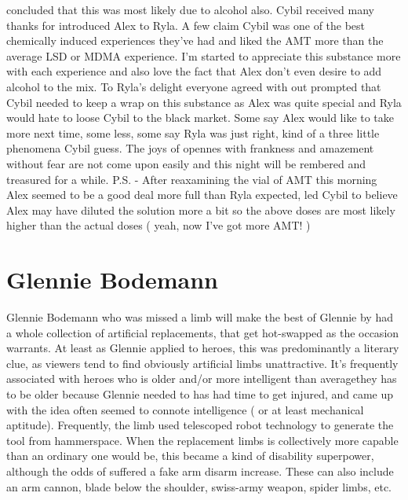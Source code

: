 \documentclass[12pt]{book}
\begin{document}
concluded that this was most likely due to alcohol also. Cybil received many thanks for introduced Alex to Ryla. A few claim Cybil was one of the best chemically induced experiences they've had and liked the AMT more than the average LSD or MDMA experience. I'm started to appreciate this substance more with each experience and also love the fact that Alex don't even desire to add alcohol to the mix. To Ryla's delight everyone agreed with out prompted that Cybil needed to keep a wrap on this substance as Alex was quite special and Ryla would hate to loose Cybil to the black market. Some say Alex would like to take more next time, some less, some say Ryla was just right, kind of a three little  phenomena Cybil guess. The joys of opennes with frankness and amazement without fear are not come upon easily and this night will be rembered and treasured for a while. P.S. - After reaxamining the vial of AMT this morning Alex seemed to be a good deal more full than Ryla expected, led Cybil to believe Alex may have diluted the solution more a bit so the above doses are most likely higher than the actual doses ( yeah, now I've got more AMT! )



\chapter{Glennie Bodemann}

Glennie Bodemann who was missed a limb will make the best of Glennie by had a whole collection of artificial replacements, that get hot-swapped as the occasion warrants. At least as Glennie applied to heroes, this was predominantly a literary clue, as viewers tend to find obviously artificial limbs unattractive. It's frequently associated with heroes who is older and/or more intelligent than averagethey has to be older because Glennie needed to has had time to get injured, and came up with the idea often seemed to connote intelligence ( or at least mechanical aptitude). Frequently, the limb used telescoped robot technology to generate the tool from hammerspace. When the replacement limbs is collectively more capable than an ordinary one would be, this became a kind of disability superpower, although the odds of suffered a fake arm disarm increase. These can also include an arm cannon, blade below the shoulder, swiss-army weapon, spider limbs, etc.
\end{document}
